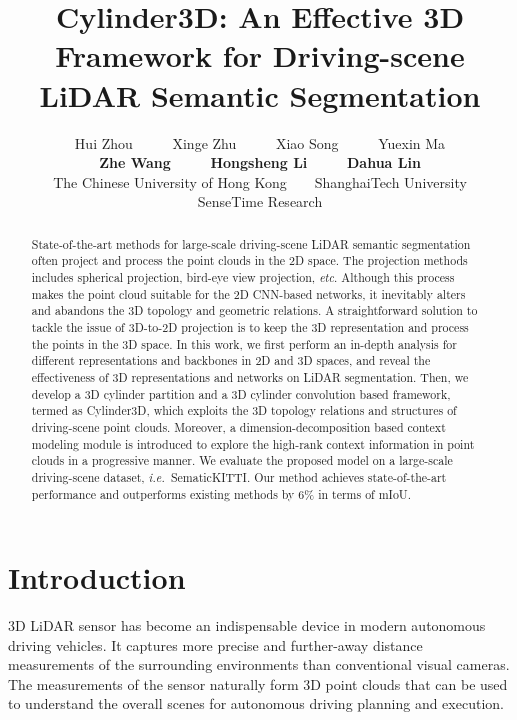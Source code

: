 \documentclass{article}
\title{Cylinder3D: An Effective 3D Framework for Driving-scene LiDAR Semantic Segmentation}
\author{
  Hui Zhou~~~~~ Xinge Zhu~~~~~ Xiao Song~~~~~ Yuexin Ma 
  \\ \textbf{Zhe Wang}~~~~~ \textbf{Hongsheng Li}~~~~~ \textbf{Dahua Lin} \\
  The Chinese University of Hong Kong~~~~ShanghaiTech University\\SenseTime Research}
\def\ie{\emph{i.e.}}
\def\etc{\emph{etc}}
\begin{document}
\maketitle




\begin{abstract}
    
State-of-the-art methods for large-scale driving-scene LiDAR semantic segmentation often {project and process the point clouds in the 2D space}. {The projection methods} includes spherical projection, bird-eye view projection, \etc. Although this process makes the point cloud suitable for the 2D CNN-based {networks}, it  inevitably alters {and abandons} the 3D topology and geometric relations. 
A straightforward {solution} to tackle the issue of 3D-to-2D projection is to keep the 3D representation and process the points in the 3D space. 
In this work, we first perform an in-depth analysis for different representations and backbones in 2D and 3D spaces, and reveal the effectiveness of 3D representations and networks on LiDAR segmentation. Then, we develop a 3D cylinder partition and a 3D cylinder convolution based framework, termed as Cylinder3D, which exploits the 3D topology relations and structures of driving-scene point clouds. 
Moreover, a dimension-decomposition based context modeling module is introduced to explore the high-rank context information in point clouds in a progressive manner.
We evaluate the proposed model on a large-scale driving-scene dataset, \ie~SematicKITTI. Our method achieves state-of-the-art performance and outperforms existing methods by 6\% in terms of mIoU.
    
\end{abstract}



\section{Introduction}
	 3D {LiDAR} sensor has become an {indispensable device} in {modern} autonomous driving {vehicles}. It {captures} more precise and further-away {distance measurements of the surrounding environments} than conventional visual cameras. {The measurements of the sensor naturally form 3D point clouds that can be used to understand the overall scenes for autonomous driving planning and execution.}
	 
\end{document}
